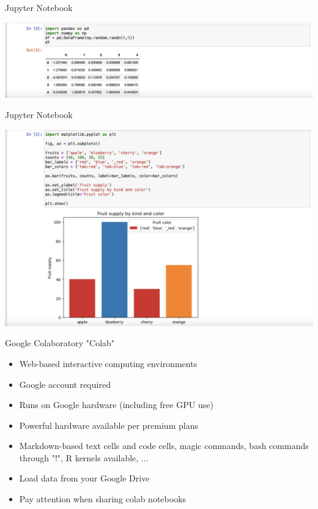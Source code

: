 \documentclass[10pt, aspectratio=169]{beamer}
\newcommand{\cemph}[1]{\textcolor{mzescyan}{#1}}
\begin{document}
{\begin{frame}{Jupyter Notebook}

   \begin{center}
       \includegraphics[scale=0.3]{Day 1/Slides/LaTeX files/Notebook1.png}
   \end{center}
    
\end{frame}

\begin{frame}{Jupyter Notebook}

   \begin{center}
       \includegraphics[scale=0.3]{Day 1/Slides/LaTeX files/Notebook4.png}
   \end{center}
    
\end{frame}


\begin{frame}{Google Colaboratory}
    \small
    \cemph{"Colab"}
    \begin{itemize}
        \item Web-based interactive computing environments
        \item Google account required
        \item Runs on Google hardware (including free GPU use)
        \item Powerful hardware available per premium plans
        \item Markdown-based text cells and code cells, magic commands, bash commands through "!", R kernels available, ...
        \item Load data from your Google Drive
        \item Pay attention when sharing colab notebooks
    \end{itemize}
    

\end{frame}}
\end{document}
